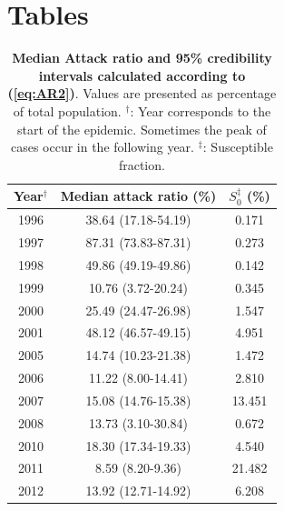 \section*{Tables}
% 
%
%



\begin{table}[!ht]
\caption{
{\bf Median Attack ratio and 95\% credibility intervals calculated according to 
(\ref{eq:AR2})}. Values are presented as percentage of total population. 
$^\dag$: Year corresponds to the start of the epidemic. 
Sometimes the peak of cases occur in the following year.
$^\ddag$: Susceptible fraction.}
\begin{center}
\begin{tabular}{c|c|c}
\hline
Year$^\dag$ & Median attack ratio (\%) & $S_0^\ddag$ (\%)\\
\hline
1996 & 38.64 (17.18-54.19) & 0.171\\
1997 & 87.31 (73.83-87.31) & 0.273\\
1998 & 49.86 (49.19-49.86) & 0.142\\
1999 & 10.76 (3.72-20.24) & 0.345\\
2000 & 25.49 (24.47-26.98) & 1.547\\
2001 & 48.12 (46.57-49.15) & 4.951\\
2005 & 14.74 (10.23-21.38) & 1.472\\
2006 & 11.22 (8.00-14.41) & 2.810\\
2007 & 15.08 (14.76-15.38) & 13.451\\
2008 & 13.73 (3.10-30.84) & 0.672\\
2010 & 18.30 (17.34-19.33) & 4.540\\
2011 & 8.59 (8.20-9.36) & 21.482\\
2012 & 13.92 (12.71-14.92) & 6.208\\

\hline
\end{tabular}


\end{center}



\label{tab:AR}
\end{table}

